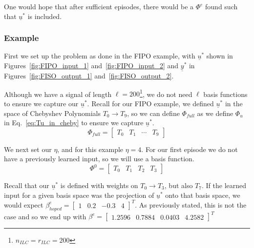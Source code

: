 One would hope that after sufficient episodes, there would be a $\Phi^e$ found such that $\underline{u}^\ast$ is included.

\FloatBarrier\subsubsection{Example}
First we set up the problem as done in the FIPO example, with $\underline{u}^\ast$ shown in Figures~\ref{fig:FIPO_input_1} and~\ref{fig:FIPO_input_2} and $\underline{y}^\ast$ in Figures~\ref{fig:FISO_output_1} and~\ref{fig:FISO_output_2}.

Although we have a signal of length $\ell = 200$\footnote{$n_{ILC} = r_{ILC} = 200$}, we do not need $\ell$ basis functions to ensure we capture our $\underline{u}^\ast$. Recall for our FIPO example, we defined $\underline{u}^\ast$ in the space of Chebyshev Polynomials $T_0 \to T_9$, so we can define $\Phi_{full}$ as we define $\Phi_u$ in Eq.~\ref{eq:Tu_in_cheby} to ensure we capture $\underline{u}^\ast$.
\begin{equation}
    \Phi_{full} =
    \begin{bmatrix}
        T_0 & T_1 & \cdots & T_9
    \end{bmatrix}
\end{equation}

We next set our $\eta$, and for this example $\eta = 4$. For our first episode we do not have a previously learned input, so we will use a basis function. 
\begin{equation}
    \Phi^0 =
    \begin{bmatrix}
        T_0 & T_1 & T_2 & T_3
    \end{bmatrix}
\end{equation}

Recall that our $\underline{u}^\ast$ is defined with weights on $T_0 \to T_3$, but also $T_7$. If the learned input for a given basis space was the projection of $\underline{u}^\ast$ onto that basis space, we would expect $\beta_{hoped}^e = {\begin{bmatrix}1 & 0.2 & -0.3 & 4\end{bmatrix}}^T$. As previously stated, this is not the case and so we end up with $\beta^e = {\begin{bmatrix}1.2596  &  0.7884  &  0.0403  &  4.2582\end{bmatrix}}^T$

